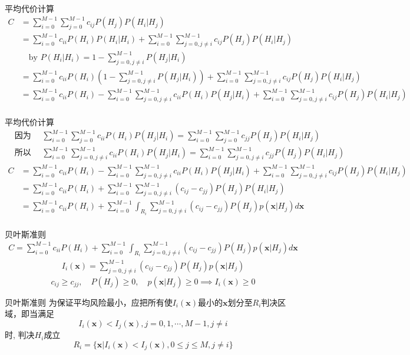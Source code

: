 \begin{frame}[shrink]{平均代价计算}
\begin{align*}
C&=\sum_{i=0}^{M-1}\sum_{j=0}^{M-1}c_{ij}P(H_j)P(H_i|H_j)\\
&=\sum_{i=0}^{M-1}c_{ii}P(H_i)P(H_i|H_i)+\sum_{i=0}^{M-1}\sum_{j=0,j\ne i}^{M-1}c_{ij}P(H_j)P(H_i|H_j)\\
&\quad \text{by } P(H_i|H_i)=1-\sum_{j=0,j\ne i}^{M-1}P(H_j|H_i)\\
&=\sum_{i=0}^{M-1}c_{ii}P(H_i)\left(1-\sum_{j=0,j\ne i}^{M-1}P(H_j|H_i)\right)+\sum_{i=0}^{M-1}\sum_{j=0,j\ne i}^{M-1}c_{ij}P(H_j)P(H_i|H_j)\\
&=\sum_{i=0}^{M-1}c_{ii}P(H_i)-\sum_{i=0}^{M-1}\sum_{j=0,j\ne i}^{M-1}c_{ii}P(H_i)P(H_j|H_i)+\sum_{i=0}^{M-1}\sum_{j=0,j\ne i}^{M-1}c_{ij}P(H_j)P(H_i|H_j)\\
\end{align*}
\end{frame}

\begin{frame}[shrink]{平均代价计算}
\begin{align*}
&\text{因为 }\quad \sum_{i=0}^{M-1}\sum_{j=0}^{M-1}c_{ii}P(H_i)P(H_j|H_i)=\sum_{i=0}^{M-1}\sum_{j=0}^{M-1}c_{jj}P(H_j)P(H_i|H_j)\\
&\text{所以 }\quad \sum_{i=0}^{M-1}\sum_{j=0,j\ne i}^{M-1}c_{ii}P(H_i)P(H_j|H_i)=\sum_{i=0}^{M-1}\sum_{j=0,j\ne i}^{M-1}c_{jj}P(H_j)P(H_i|H_j)
\end{align*}
\begin{align*}
C&=\sum_{i=0}^{M-1}c_{ii}P(H_i)-\sum_{i=0}^{M-1}\sum_{j=0,j\ne i}^{M-1}c_{ii}P(H_i)P(H_j|H_i)+\sum_{i=0}^{M-1}\sum_{j=0,j\ne i}^{M-1}c_{ij}P(H_j)P(H_i|H_j)\\
&=\sum_{i=0}^{M-1}c_{ii}P(H_i)+\sum_{i=0}^{M-1}\sum_{j=0,j\ne i}^{M-1}\left(c_{ij}-c_{jj}\right)P(H_j)P(H_i|H_j)\\
&=\sum_{i=0}^{M-1}c_{ii}P(H_i)+\sum_{i=0}^{M-1}\int_{R_i}\sum_{j=0,j\ne i}^{M-1}\left(c_{ij}-c_{jj}\right)P(H_j)p(\bm{x}|H_j)d\bm{x}\\
\end{align*}
\end{frame}

\begin{frame}[shrink]{贝叶斯准则}
\begin{align*}
C=\sum_{i=0}^{M-1}c_{ii}P(H_i)+\sum_{i=0}^{M-1}\int_{R_i}\sum_{j=0,j\ne i}^{M-1}\left(c_{ij}-c_{jj}\right)P(H_j)p(\bm{x}|H_j)d\bm{x}
\end{align*}
\begin{align*}
I_{i}(\bm{x})=\sum_{j=0,j\ne i}^{M-1}\left(c_{ij}-c_{jj}\right)P(H_j)p(\bm{x}|H_j)
\end{align*}
\[c_{ij}\ge c_{jj},\quad P(H_j)\ge 0,\quad p(\bm{x}|H_j)\ge 0\implies I_{i}(\bm{x})\ge 0 \]
\begin{block}{贝叶斯准则}
为保证平均风险最小，应把所有使$I_{i}(\bm{x})$最小的$\bm{x}$划分至$R_i$判决区域，即当满足
\[I_{i}(\bm{x})<I_j(\bm{x}), j=0,1,\cdots,M-1, j\ne i \]
时, 判决$H_i$成立
\[R_i=\{\bm{x}|I_i(\bm{x})<I_j(\bm{x}), 0\le j\le M, j\ne i\} \]
\end{block}
\end{frame}

